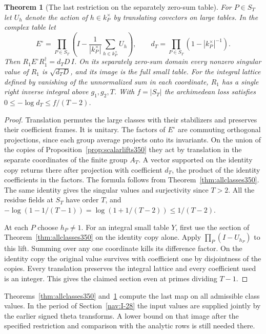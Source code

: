 \documentclass[a4paper,11pt]{article}
\newtheorem{theorem}[proposition]{Theorem}
\theoremstyle{definition}
\theoremstyle{remark}
\numberwithin{equation}{section}
\begin{document}
\begin{theorem}[The last restriction on the separately zero-sum table]\leavevmode
\label{thm:augmented350}
For \(P\in S_T\) let \(U_h\) denote the action of \(h\in k_P^\times\)
by translating covectors on large tables. In the complex table let
\[
 E^\circ=\prod_{P\in S_T}
     \left(I-\frac{1}{|k_P^\times|}\sum_{h\in k_P^\times}U_h\right),
 \qquad d_T=\prod_{P\in S_T}(1-|k_P^\times|^{-1}).
\]
Then \(R_1E^\circ R_1^\dagger=d_TD\,I\). On its separately
zero-sum domain every nonzero singular value of \(R_1\) is
\(\sqrt{d_TD}\), and its image is the full small table.
For the integral lattice defined by vanishing of the unnormalized
sum in each coordinate, \(R_1\) has a single right inverse
integral above \(g_1,g_2,T\). With \(f=|S_T|\) the archimedean
loss satisfies \(0\le-\log d_T\le f/(T-2)\).
\end{theorem}
\begin{proof}
Translation permutes the large classes with their stabilizers and
preserves their coefficient frames. It is unitary. The factors of
\(E^\circ\) are commuting orthogonal projections, since each group
average projects onto its invariants. On the union of the copies
of Proposition~\ref{prop:scalarlifts350} they act by translation
in the separate coordinates of the finite group \(A_T\). A vector
supported on the identity copy returns there after projection with
coefficient \(d_T\), the product of the identity coefficients in
the factors. The formula follows from
Theorem~\ref{thm:allclasses350}. The same identity gives the singular
values and surjectivity since \(T>2\). All the residue fields
at \(S_T\) have order \(T\), and
\(-\log(1-1/(T-1))=\log(1+1/(T-2))\le1/(T-2)\).

At each \(P\) choose \(h_P\ne1\). For an integral small table
\(Y\), first use the section of Theorem~\ref{thm:allclasses350}
on the identity copy alone. Apply \(\prod_P(I-U_{h_P})\) to this
lift. Summing over any one coordinate kills its difference factor.
On the identity copy the original value survives with coefficient
one by disjointness of the copies. Every translation preserves the
integral lattice and every coefficient used is an integer. This
gives the claimed section even at primes dividing \(T-1\).
\end{proof}

Theorems~\ref{thm:allclasses350} and~\ref{thm:augmented350}
compute the last map on all admissible class values. In the
period of Section~\ref{nav:I-28} the input values are supplied
jointly by the earlier signed theta transforms. A lower bound on
that image after the specified restriction and comparison with
the analytic rows is still needed there.
\end{document}
